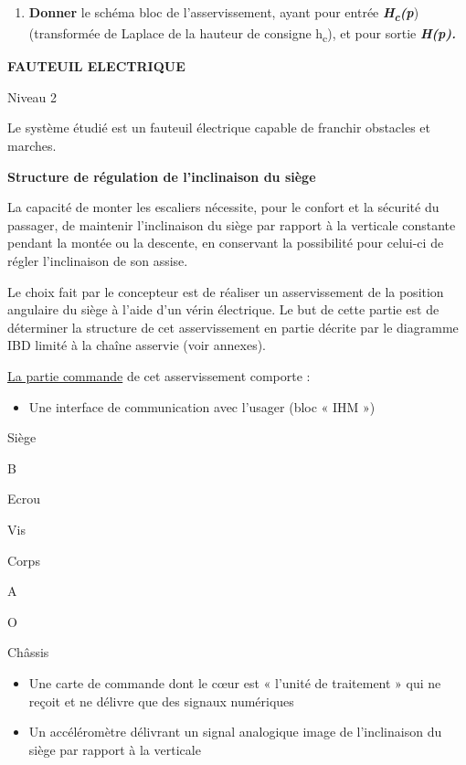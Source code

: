 \begin{enumerate}
\def\labelenumi{\arabic{enumi}.}
\setcounter{enumi}{3}
\item
  \textbf{Donner} le schéma bloc de l'asservissement, ayant pour entrée
  \emph{\textbf{H\textsubscript{c}(p}}) (transformée de Laplace de la
  hauteur de consigne h\textsubscript{c}), et pour sortie
  \emph{\textbf{H(p).}}
\end{enumerate}

\emph{\hfill\break
}

\textbf{FAUTEUIL ELECTRIQUE}

Niveau 2


Le système étudié est un fauteuil électrique capable de franchir
obstacles et marches.

\textbf{Structure de régulation de l'inclinaison du siège}

La capacité de monter les escaliers nécessite, pour le confort et la
sécurité du passager, de maintenir l'inclinaison du siège par rapport à
la verticale constante pendant la montée ou la descente, en conservant
la possibilité pour celui-ci de régler l'inclinaison de son assise.

Le choix fait par le concepteur est de réaliser un asservissement de la
position angulaire du siège à l'aide d'un vérin électrique. Le but de
cette partie est de déterminer la structure de cet asservissement en
partie décrite par le diagramme IBD limité à la chaîne asservie (voir
annexes).

\ul{La partie commande} de cet asservissement comporte :

\begin{itemize}
\item
  Une interface de communication avec l'usager (bloc « IHM »)
\end{itemize}

Siège

B

Ecrou

Vis

Corps

A

O

Châssis

\begin{itemize}
\item
  Une carte de commande dont le cœur est « l'unité de traitement » qui
  ne reçoit et ne délivre que des signaux numériques
\item
  Un accéléromètre délivrant un signal analogique image de l'inclinaison
  du siège par rapport à la verticale
\end{itemize}

